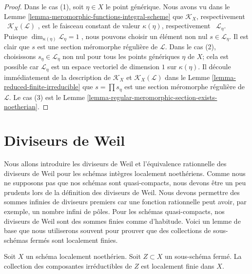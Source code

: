 \begin{proof}
Dans le cas (1), soit  $\eta \in X$  le point générique. Nous avons vu dans le Lemme
 \ref{lemma-meromorphic-functions-integral-scheme}  que  $\mathcal{K}_X$, respectivement \ $\mathcal{K}_X(\mathcal{L})$ , est le
faisceau constant de valeur  $\kappa(\eta)$, respectivement \ $\mathcal{L}_\eta$.
Puisque  $\dim_{\kappa(\eta)} \mathcal{L}_\eta = 1$ , nous pouvons choisir un élément non nul  $s \in \mathcal{L}_\eta$. Il est
clair que  $s$  est une section méromorphe régulière de  $\mathcal{L}$. Dans
le cas (2), choisissons  $s_\eta \in \mathcal{L}_\eta$  non nul pour tous les points génériques
 $\eta$  de  $X$; cela est possible car  $\mathcal{L}_\eta$  est un espace
vectoriel de dimension  $1$ sur  $\kappa(\eta)$. Il découle immédiatement de
la description de  $\mathcal{K}_X$  et  $\mathcal{K}_X(\mathcal{L})$  dans le Lemme  \ref{lemma-reduced-finite-irreducible}  que
 $s = \prod s_\eta$  est une section méromorphe régulière de  $\mathcal{L}$. Le cas (3) est
le Lemme  \ref{lemma-regular-meromorphic-section-exists-noetherian}.
\end{proof}






\section{Diviseurs de Weil}
\label{section-Weil-divisors}

\noindent
Nous allons introduire les diviseurs de Weil et l'équivalence rationnelle des
diviseurs de Weil pour les schémas intègres localement noethériens. Comme nous ne
supposons pas que nos schémas sont quasi-compacts, nous devons être un peu
prudents lors de la définition des diviseurs de Weil. Nous devons permettre des
sommes infinies de diviseurs premiers car une fonction rationnelle peut avoir, par
exemple, un nombre infini de pôles. Pour les schémas quasi-compacts, nos diviseurs
de Weil sont des sommes finies comme d'habitude. Voici un lemme de base que nous
utiliserons souvent pour prouver que des collections de sous-schémas fermés sont
localement finies.

\begin{lemma}
\label{lemma-components-locally-finite}
Soit  $X$  un schéma localement noethérien. Soit  $Z \subset X$  un
sous-schéma fermé. La collection des composantes irréductibles de  $Z$  est
localement finie dans  $X$.
\end{lemma}

